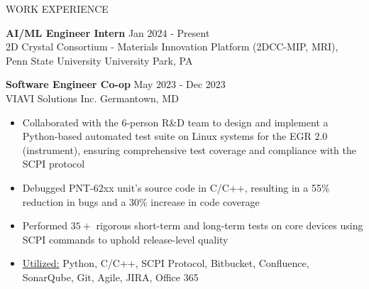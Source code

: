 \documentclass{resume} %
\begin{document}
\begin{rSection}{WORK EXPERIENCE}

{\bf AI/ML Engineer Intern} \hfill Jan $2024$ - Present\\
2D Crystal Consortium - Materials Innovation Platform (2DCC-MIP, MRI), Penn State University \hfill University Park, PA

{\bf Software Engineer Co-op} \hfill May $2023$ - Dec $2023$\\
VIAVI Solutions Inc. \hfill Germantown, MD
\begin{itemize}[itemsep = -4pt]
    \item Collaborated with the 6-person R\&D team to design and implement a Python-based automated test suite on Linux systems for the EGR $2.0$ (instrument), ensuring comprehensive test coverage and compliance with the SCPI protocol
    \item Debugged PNT-$62$xx unit's source code in C/C++, resulting in a 55\% reduction in bugs and a 30\% increase in code coverage
    \item Performed $35+$ rigorous short-term and long-term tests on core devices using SCPI commands to uphold release-level quality
    \item \underline{Utilized:} Python, C/C++, SCPI Protocol, Bitbucket, Confluence, SonarQube, Git, Agile, JIRA, Office 365
\end{itemize}


\end{rSection}
\end{document}
